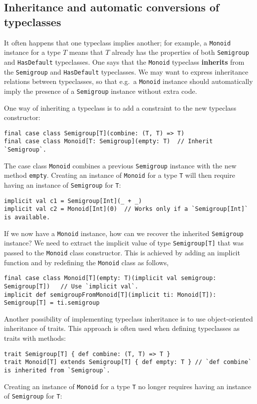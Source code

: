 \subsection{Inheritance and automatic conversions of typeclasses\label{subsec:Inheritance-and-automatic-typeclass}}

It often happens that one typeclass implies another; for example,
a \lstinline!Monoid! instance for a type $T$ means that $T$ already
has the properties of both \lstinline!Semigroup! and \lstinline!HasDefault!
typeclasses. One says that the \lstinline!Monoid! typeclass \textbf{inherits}
from the \lstinline!Semigroup! and \lstinline!HasDefault! typeclasses.
We may want to express inheritance relations between typeclasses,
so that e.g.~a \lstinline!Monoid! instance should automatically
imply the presence of a \lstinline!Semigroup! instance without extra
code.

One way of inheriting a typeclass is to add a constraint to the new
typeclass constructor:
\begin{lstlisting}
final case class Semigroup[T](combine: (T, T) => T)
final case class Monoid[T: Semigroup](empty: T)  // Inherit `Semigroup`.
\end{lstlisting}
The case class \lstinline!Monoid! combines a previous \lstinline!Semigroup!
instance with the new method \lstinline!empty!. Creating an instance
of \lstinline!Monoid! for a type \lstinline!T! will then require
having an instance of \lstinline!Semigroup! for \lstinline!T!:
\begin{lstlisting}
implicit val c1 = Semigroup[Int](_ + _)
implicit val c2 = Monoid[Int](0)  // Works only if a `Semigroup[Int]` is available.
\end{lstlisting}

If we now have a \lstinline!Monoid! instance, how can we recover
the inherited \lstinline!Semigroup! instance? We need to extract
the implicit value of type \lstinline!Semigroup[T]! that was passed
to the \lstinline!Monoid! class constructor. This is achieved by
adding an implicit function and by redefining the \lstinline!Monoid!
class as follows,
\begin{lstlisting}
final case class Monoid[T](empty: T)(implicit val semigroup: Semigroup[T])   // Use `implicit val`.
implicit def semigroupFromMonoid[T](implicit ti: Monoid[T]): Semigroup[T] = ti.semigroup
\end{lstlisting}

Another possibility of implementing typeclass inheritance is to use
object-oriented inheritance of traits. This approach is often used
when defining typeclasses as traits with methods:
\begin{lstlisting}
trait Semigroup[T] { def combine: (T, T) => T }
trait Monoid[T] extends Semigroup[T] { def empty: T } // `def combine` is inherited from `Semigroup`.
\end{lstlisting}
Creating an instance of \lstinline!Monoid! for a type \lstinline!T!
no longer requires having an instance of \lstinline!Semigroup! for
\lstinline!T!:

